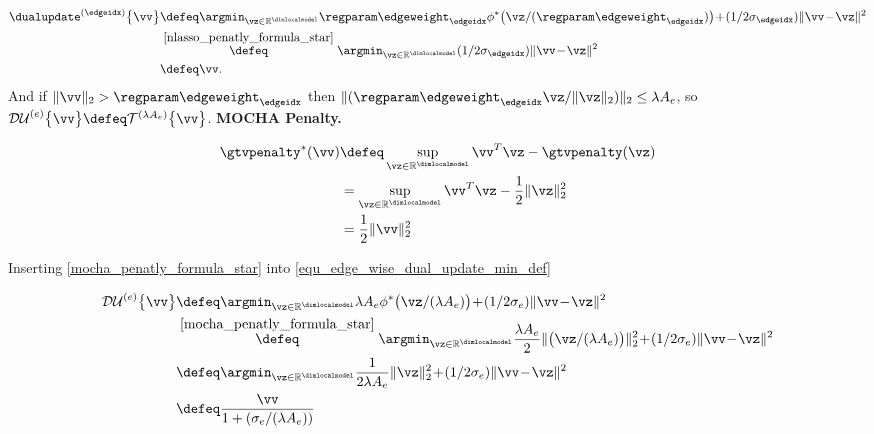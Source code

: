 \documentclass[lettersize,journal]{IEEEtran}
\begin{document}
\begin{align} 
\label{nlasso_penatly_dual_update}
\dualupdate^{(\edgeidx)} \big\{ \vv \big \} &{\defeq \argmin_{\vz \in \mathbb{R}^{\dimlocalmodel}} \regparam \edgeweight_{\edgeidx} \phi^{*}\big(\vz/(\regparam \edgeweight_{\edgeidx}) \big) \!+\!(1/2\sigma_{\edgeidx}) \|\vv\!-\!\vz\|^{2}}
\nonumber \\
& \stackrel{\eqref{nlasso_penatly_formula_star}}{\defeq} \argmin_{\vz \in \mathbb{R}^{\dimlocalmodel}} (1/2\sigma_{\edgeidx}) \|\vv\!-\!\vz\|^{2}
\nonumber \\
& \defeq \vv. 
\end{align} 
And if $\|\vv\|_2 > \regparam \edgeweight_{\edgeidx}$ then $\| (\regparam \edgeweight_{\edgeidx} \vz/\|\vz\|_{2}) \|_2 \leq \lambda A_{e}$, so $\mathcal{DU}^{(e)}  \big\{ \vv \big \} \defeq \mathcal{T}^{(\lambda A_{e})} \big\{ \vv \big \}$.
\newline
{\bf MOCHA Penalty.} %


\begin{align} 
\label{mocha_penatly_formula_star}
\gtvpenalty^{*}(\vv) &\defeq  \sup_{\vz \in \mathbb{R}^{\dimlocalmodel}} \vv^{T}\vz - \gtvpenalty(\vz) 
\nonumber \\
& =  \sup_{\vz \in \mathbb{R}^{\dimlocalmodel}} \vv^{T}\vz - \frac{1}{2}\|\vz\|_2^2
\nonumber \\
 & 
 = \frac{1}{2}\|\vv\|_2^2
\end{align} 


Inserting \ref{mocha_penatly_formula_star} into \ref{equ_edge_wise_dual_update_min_def} 

\begin{align} 
\label{mocha_penatly_dual_update}
\mathcal{DU}^{(e)} \big\{ \vv \big \} &{\defeq \argmin_{\vz \in \mathbb{R}^{\dimlocalmodel}} \lambda A_{e} \phi^{*}\big(\vz/(\lambda A_{e}) \big) \!+\!(1/2\sigma_{e}) \|\vv\!-\!\vz\|^{2}}
\nonumber \\
& \stackrel{\eqref{mocha_penatly_formula_star}}{\defeq} \argmin_{\vz \in \mathbb{R}^{\dimlocalmodel}} \frac{\lambda A_{e}}{2} \|\big(\vz/(\lambda A_{e}) \big)\|_2^2 \!+\!(1/2\sigma_{e}) \|\vv\!-\!\vz\|^{2}
\nonumber \\
& \defeq \argmin_{\vz \in \mathbb{R}^{\dimlocalmodel}} \frac{1}{2\lambda A_{e}} \|\vz\|_2^2 \!+\!(1/2\sigma_{e}) \|\vv\!-\!\vz\|^{2}
\nonumber \\
&  \defeq \frac{\vv}{1  + (\sigma_{e}/(\lambda A_{e})) }
\end{align} 
\end{document}
